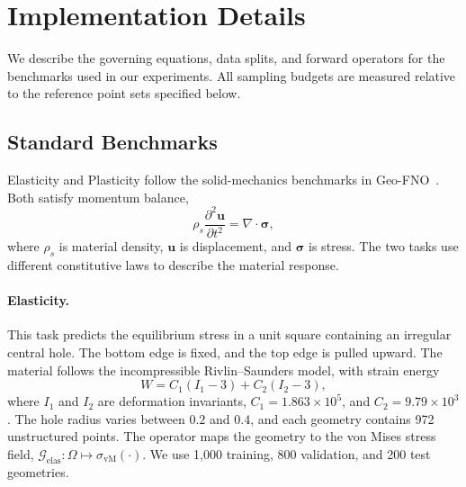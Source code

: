 \section{Implementation Details}
\label{app:implementation_details}

We describe the governing equations, data splits, and forward operators for the benchmarks used in our experiments. All sampling budgets are measured relative to the reference point sets specified below.

\subsection{Standard Benchmarks}
\label{app:standard_benchmarks}

Elasticity and Plasticity follow the solid-mechanics benchmarks in Geo-FNO~\citep{li2023geofno}. Both satisfy momentum balance,
\begin{equation}
    \rho_s\frac{\partial^2\mathbf{u}}{\partial t^2}
    =\nabla\!\cdot\boldsymbol{\sigma},
    \label{eq:app_solid_balance}
\end{equation}
where $\rho_s$ is material density, $\mathbf{u}$ is displacement, and $\boldsymbol{\sigma}$ is stress. The two tasks use different constitutive laws to describe the material response.

\paragraph{Elasticity.}
This task predicts the equilibrium stress in a unit square containing an irregular central hole. The bottom edge is fixed, and the top edge is pulled upward. The material follows the incompressible Rivlin--Saunders model, with strain energy
\begin{equation}
    W=C_1(I_1-3)+C_2(I_2-3),
    \label{eq:app_elasticity}
\end{equation}
where $I_1$ and $I_2$ are deformation invariants, $C_1=1.863\times10^5$, and $C_2=9.79\times10^3$. The hole radius varies between $0.2$ and $0.4$, and each geometry contains 972 unstructured points. The operator maps the geometry to the von Mises stress field, $\mathcal{G}_{\mathrm{elas}}:\Omega\mapsto\sigma_{\mathrm{vM}}(\cdot)$. We use 1,000 training, 800 validation, and 200 test geometries.

